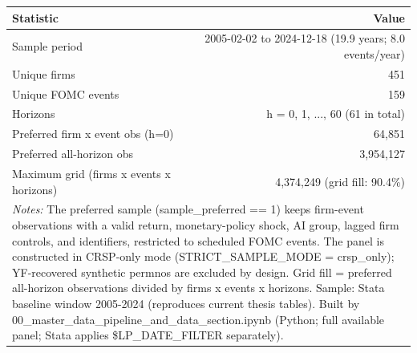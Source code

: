 \begin{tabular}{lr}
\toprule
Statistic & Value \\
\midrule
Sample period & 2005-02-02 to 2024-12-18 (19.9 years; 8.0 events/year) \\
Unique firms & 451 \\
Unique FOMC events & 159 \\
Horizons & h = 0, 1, ..., 60 (61 in total) \\
Preferred firm x event obs (h=0) & 64,851 \\
Preferred all-horizon obs & 3,954,127 \\
Maximum grid (firms x events x horizons) & 4,374,249 (grid fill: 90.4\%) \\
\bottomrule
\multicolumn{2}{p{0.95\linewidth}}{\footnotesize \textit{Notes:} The preferred sample (sample\_preferred == 1) keeps firm-event observations with a valid return, monetary-policy shock, AI group, lagged firm controls, and identifiers, restricted to scheduled FOMC events. The panel is constructed in CRSP-only mode (STRICT\_SAMPLE\_MODE = crsp\_only); YF-recovered synthetic permnos are excluded by design. Grid fill = preferred all-horizon observations divided by firms x events x horizons. Sample: Stata baseline window 2005-2024 (reproduces current thesis tables). Built by 00\_master\_data\_pipeline\_and\_data\_section.ipynb (Python; full available panel; Stata applies \$LP\_DATE\_FILTER separately).} \\
\end{tabular}
